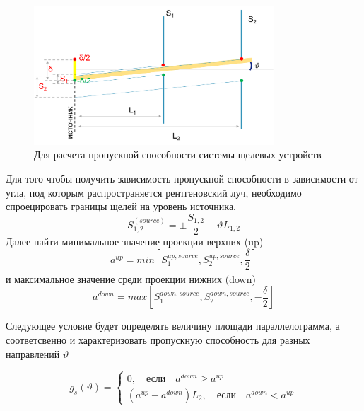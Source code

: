 \newpage
  \begin{center}
  \section{ }%
  \label{sec:calc_slits_ability}
  \end{center}


\begin{figure}[H]
  \centering
  \includegraphics[width=0.8\textwidth]{images/calc_slits_ability.png}
  \caption{Для расчета пропускной способности системы щелевых устройств}
  \label{ris:calc_slits_ability}
\end{figure}

Для того чтобы получить зависимость пропускной способности в зависимости от угла,
под которым распространяется рентгеновский луч, необходимо спроецировать границы
щелей на уровень источника.
$$ S^{(source)}_{1,2} = \pm \frac{S_{1,2}}{2} - \vartheta L_{1,2}$$
 Далее найти минимальное значение проекции верхних (up)
 $$ a^{up} = min [S_1^{up,source},S_2^{up,source},\frac{\delta}{2}]$$
и максимальное значение среди проекции нижних (down)
$$ a^{down} = max [S_1^{down,source},S_2^{down,source},-\frac{\delta}{2}]$$

Следующее условие будет определять величину площади параллелограмма, а соответсвенно
и характеризовать пропускную способность для разных направлений $\vartheta$

\begin{equation}
  g_s(\vartheta) =
 \begin{cases}
   0, \quad \text{если} \quad a^{down} \geq a^{up}
   \\
    (a^{up} - a^{down})L_2,\quad \text{если} \quad a^{down} < a^{up}
 \end{cases}
\end{equation}
